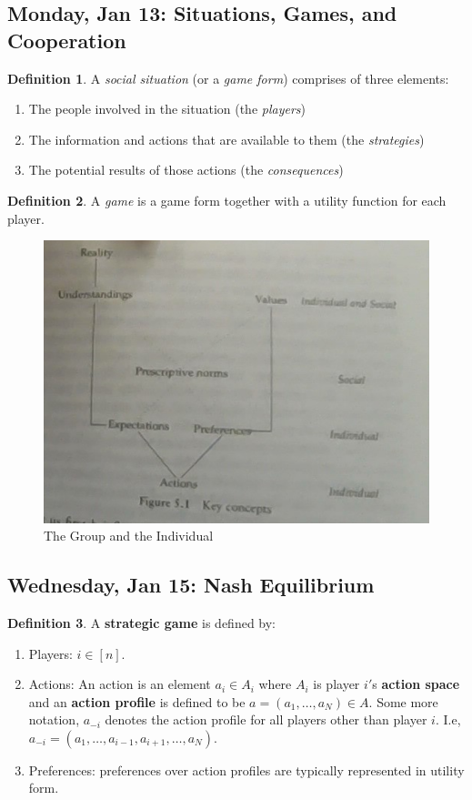\documentclass[10pt, oneside]{article}
\theoremstyle{definition}
\newtheorem{defn}{Definition}
\begin{document}
\subsection{Monday, Jan 13: Situations, Games, and Cooperation}
\begin{defn}
    A \textit{social situation} (or a \textit{game form}) comprises of three elements:
    \begin{enumerate}
        \item The people involved in the situation (the \textit{players})
        \item The information and actions that are available to them (the \textit{strategies})
        \item The potential results of those actions (the \textit{consequences})
    \end{enumerate}
\end{defn}
\begin{defn}
    A \textit{game} is a game form together with a utility function for each player.
\end{defn}
\begin{figure}[H]
    \centering
    \includegraphics[width=0.5\linewidth]{Images/The Group and the Individual.png}
    \caption{The Group and the Individual}
\end{figure}





\newpage
\subsection{Wednesday, Jan 15: Nash Equilibrium}
\begin{defn}
    A \textbf{strategic game} is defined by:
    \begin{enumerate}
        \item Players: $i\in [n].$
        \item Actions: An action is an element $a_i \in A_i$ where $A_i$ is player $i'$s \textbf{action space} and an \textbf{action profile} is defined to be $a = (a_1, \dots, a_N)\in A.$ Some more notation, $a_{-i}$ denotes the action profile for all players other than player $i.$ I.e, $a_{-i}= (a_1, \dots, a_{i-1}, a_{i+1}, \dots, a_N).$
        \item Preferences: preferences over action profiles are typically represented in utility form. 
    \end{enumerate}
\end{defn}
\end{document}
